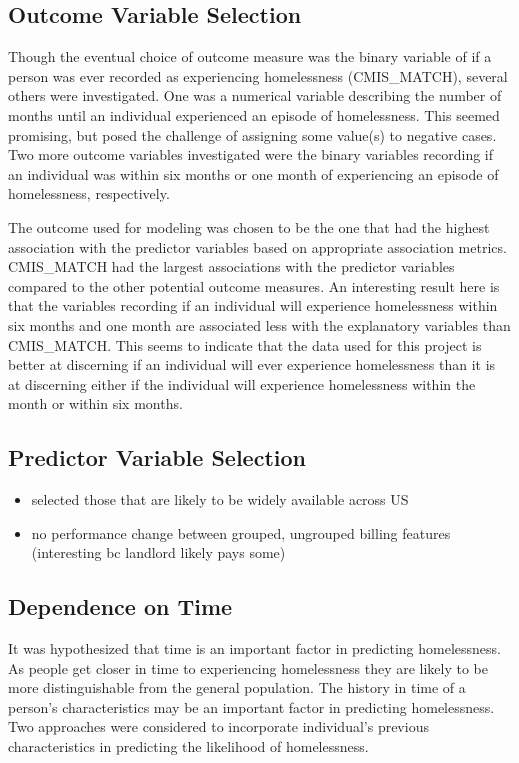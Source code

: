 \documentclass[10pt,letterpaper]{article}
\begin{document}
\subsection*{Outcome Variable Selection}
Though the eventual choice of outcome measure was the binary variable of if a person was ever recorded as experiencing homelessness (CMIS\_MATCH), several others were investigated. One was a numerical variable describing the number of months until an individual experienced an episode of homelessness. This seemed promising, but posed the challenge of assigning some value(s) to negative cases. Two more outcome variables investigated were the binary variables recording if an individual was within six months or one month of experiencing an episode of homelessness, respectively. 

The outcome used for modeling was chosen to be the one that had the highest association with the predictor variables based on appropriate association metrics. CMIS\_MATCH had the largest associations with the predictor variables compared to the other potential outcome measures. An interesting result here is that the variables recording if an individual will experience homelessness within six months and one month are associated less with the explanatory variables than CMIS\_MATCH. This seems to indicate that the data used for this project is better at discerning if an individual will ever experience homelessness than it is at discerning either if the individual will experience homelessness within the month or within six months.

\subsection*{Predictor Variable Selection}
\begin{itemize}
    \item selected those that are likely to be widely available across US
    \item no performance change between grouped, ungrouped billing features (interesting bc landlord likely pays some)
\end{itemize}

\subsection*{Dependence on Time}
It was hypothesized that time is an important factor in predicting homelessness. As people get closer in time to experiencing homelessness they are likely to be more distinguishable from the general population. The history in time of a person's characteristics may be an important factor in predicting homelessness. Two approaches were considered to incorporate individual's previous characteristics in predicting the likelihood of homelessness.
\end{document}
